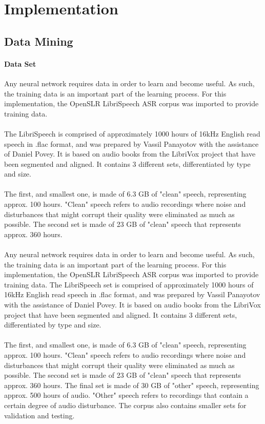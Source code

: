 \chapter{Implementation}\label{ch:implementation}

\section{Data Mining} \label{sec:DataMining}
\subsubsection{Data Set}
Any neural network requires data in order to learn and become useful. As such, the training data is an important part of the learning process. For this implementation, the OpenSLR LibriSpeech ASR corpus was imported to provide training data.\\\\
The LibriSpeech is comprised of approximately 1000 hours of 16kHz English read speech in .flac format, and was prepared by Vassil Panayotov with the assistance of Daniel Povey. It is based on audio books from the LibriVox project that have been segmented and aligned. It contains 3 different sets, differentiated by type and size.\\\\
The first, and smallest one, is made of 6.3 GB of "clean" speech, representing approx. 100 hours. "Clean" speech refers to audio recordings where noise and disturbances that might corrupt their quality were eliminated as much as possible.
The second set is made of 23 GB of "clean" speech that represents approx. 360 hours.\\\\
Any neural network requires data in order to learn and become useful. As such, the training data is an important part of the learning process. For this implementation, the OpenSLR LibriSpeech ASR corpus was imported to provide training data.
The LibriSpeech set is comprised of approximately 1000 hours of 16kHz English read speech in .flac format, and was prepared by Vassil Panayotov with the assistance of Daniel Povey. It is based on audio books from the LibriVox project that have been segmented and aligned. It contains 3 different sets, differentiated by type and size.\\\\
The first, and smallest one, is made of 6.3 GB of "clean" speech, representing approx. 100 hours. "Clean" speech refers to audio recordings where noise and disturbances that might corrupt their quality were eliminated as much as possible.
The second set is made of 23 GB of "clean" speech that represents approx. 360 hours.
The final set is made of 30 GB of "other" speech, representing approx. 500 hours of audio. "Other" speech refers to recordings that contain a certain degree of audio disturbance.
The corpus also contains smaller sets for validation and testing.

